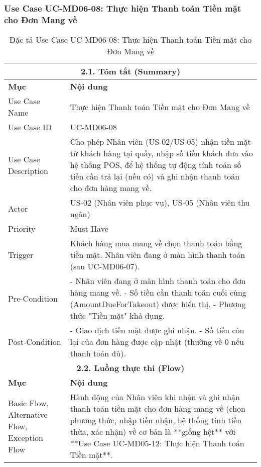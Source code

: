 \subsubsection{Use Case UC-MD06-08: Thực hiện Thanh toán Tiền mặt cho Đơn Mang về}
\begin{longtable}{|m{4cm}|p{11cm}|}
\caption{Đặc tả Use Case UC-MD06-08: Thực hiện Thanh toán Tiền mặt cho Đơn Mang về} \label{tab:uc_md06_08_final_v3} \\
\hline
\multicolumn{2}{|c|}{\textbf{2.1. Tóm tắt (Summary)}} \\
\hline
\textbf{Mục} & \textbf{Nội dung} \\
\hline
\endhead %
\hline
\endfoot %
\hline
\endlastfoot %
Use Case Name & Thực hiện Thanh toán Tiền mặt cho Đơn Mang về \\
\hline
Use Case ID & UC-MD06-08 \\
\hline
Use Case Description & Cho phép Nhân viên (US-02/US-05) nhận tiền mặt từ khách hàng tại quầy, nhập số tiền khách đưa vào hệ thống POS, để hệ thống tự động tính toán số tiền cần trả lại (nếu có) và ghi nhận thanh toán cho đơn hàng mang về. \\
\hline
Actor & US-02 (Nhân viên phục vụ), US-05 (Nhân viên thu ngân) \\
\hline
Priority & Must Have \\
\hline
Trigger & Khách hàng mua mang về chọn thanh toán bằng tiền mặt. Nhân viên đang ở màn hình thanh toán (sau UC-MD06-07). \\
\hline
Pre-Condition & - Nhân viên đang ở màn hình thanh toán cho đơn hàng mang về. \newline - Số tiền cần thanh toán cuối cùng (AmountDueForTakeout) được hiển thị. \newline - Phương thức "Tiền mặt" khả dụng. \\
\hline
Post-Condition & - Giao dịch tiền mặt được ghi nhận. \newline - Số tiền còn lại của đơn hàng được cập nhật (thường về 0 nếu thanh toán đủ). \\
\hline
\multicolumn{2}{|c|}{\textbf{2.2. Luồng thực thi (Flow)}} \\
\hline
\textbf{Mục} & \textbf{Nội dung} \\
\hline
Basic Flow, Alternative Flow, Exception Flow & Hành động của Nhân viên khi nhận và ghi nhận thanh toán tiền mặt cho đơn hàng mang về (chọn phương thức, nhập tiền nhận, hệ thống tính tiền thừa, xác nhận) về cơ bản là **giống hệt** với **Use Case UC-MD05-12: Thực hiện Thanh toán Tiền mặt**. \\

\end{longtable}
